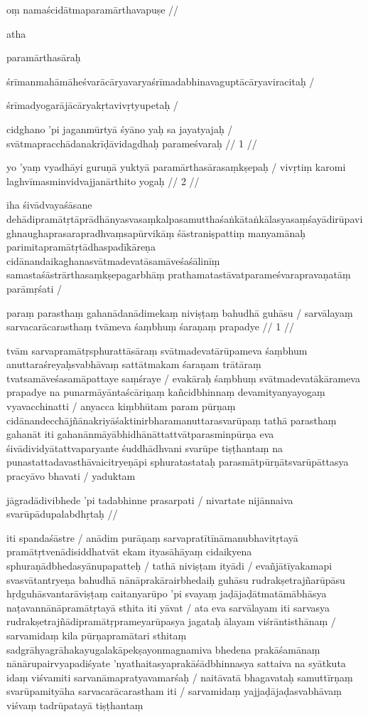 oṃ namaścidātmaparamārthavapuṣe  //

atha

paramārthasāraḥ

śrīmanmahāmāheśvarācāryavaryaśrīmadabhinavaguptācāryaviracitaḥ  /

śrīmadyogarājācāryakṛtavivṛtyupetaḥ  /



cidghano 'pi jaganmūrtyā śyāno yaḥ sa jayatyajaḥ  /
svātmapracchādanakrīḍāvidagdhaḥ parameśvaraḥ  // 1  //

yo 'yaṃ vyadhāyi guruṇā yuktyā paramārthasārasaṃkṣepaḥ  /
vivṛtiṃ karomi laghvīmasminvidvajjanārthito yogaḥ  // 2  //

iha śivādvayaśāsane dehādipramātṛtāprādhānyasvasaṃkalpasamutthaśaṅkātaṅkālasyasaṃśayādirūpavighnaughaprasarapradhvaṃsapūrvikāṃ śāstraniṣpattiṃ manyamānaḥ parimitapramātṛtādhaspadīkāreṇa cidānandaikaghanasvātmadevatāsamāveśaśālinīṃ samastaśāstrārthasaṃkṣepagarbhāṃ prathamatastāvatparameśvarapravaṇatāṃ parāmṛśati  /

paraṃ parasthaṃ gahanādanādimekaṃ niviṣṭaṃ bahudhā guhāsu  /
sarvālayaṃ sarvacarācarasthaṃ tvāmeva śaṃbhuṃ śaraṇaṃ prapadye  // 1  //

tvām sarvapramātṛsphurattāsāraṃ svātmadevatārūpameva śaṃbhum anuttaraśreyaḥsvabhāvaṃ sattātmakam śaraṇam trātāraṃ tvatsamāveśasamāpattaye saṃśraye  / evakāraḥ śaṃbhuṃ svātmadevatākārameva prapadye na punarmāyāntaścāriṇaṃ kañcidbhinnaṃ devamityanyayogaṃ vyavacchinatti  / anyacca kiṃbhūtam param pūrṇaṃ cidānandecchājñānakriyāśaktinirbharamanuttarasvarūpaṃ tathā parasthaṃ gahanāt iti gahanānmāyābhidhānāttattvātparasminpūrṇa eva śivādividyātattvaparyante śuddhādhvani svarūpe tiṣṭhantaṃ na punastattadavasthāvaicitryeṇāpi sphuratastataḥ parasmātpūrṇātsvarūpāttasya pracyāvo bhavati  / yaduktam

jāgradādivibhede 'pi tadabhinne prasarpati  /
nivartate nijānnaiva svarūpādupalabdhṛtaḥ  //

iti spandaśāstre  / anādim purāṇaṃ sarvapratītīnāmanubhavitṛtayā pramātṛtvenādisiddhatvāt ekam ityasāhāyaṃ cidaikyena sphuraṇādbhedasyānupapatteḥ  / tathā niviṣṭam ityādi  / evañjātīyakamapi svasvātantryeṇa bahudhā nānāprakārairbhedaiḥ guhāsu rudrakṣetrajñarūpāsu hṛdguhāsvantarāviṣṭaṃ caitanyarūpo 'pi svayaṃ jaḍājaḍātmatāmābhāsya naṭavannānāpramātṛtayā sthita iti yāvat  / ata eva sarvālayam iti sarvasya rudrakṣetrajñādipramātṛprameyarūpasya jagataḥ ālayam viśrāntisthānaṃ  / sarvamidaṃ kila pūrṇapramātari sthitaṃ sadgrāhyagrāhakayugalakāpekṣayonmagnamiva bhedena prakāśamānaṃ nānārupairvyapadiśyate 'nyathaitasyaprakāśādbhinnasya sattaiva na syātkuta idaṃ viśvamiti sarvanāmapratyavamarśaḥ  / naitāvatā bhagavataḥ samuttīrṇaṃ svarūpamityāha sarvacarācarastham iti  / sarvamidaṃ yajjaḍājaḍasvabhāvaṃ viśvaṃ tadrūpatayā tiṣṭhantaṃ

